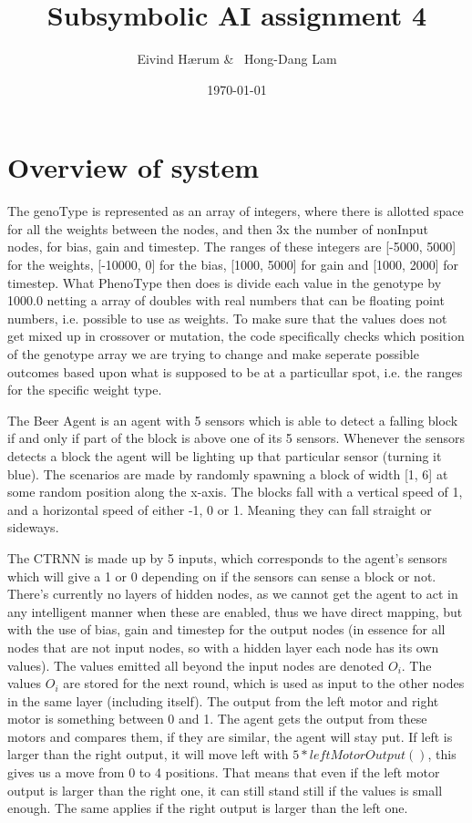 \documentclass[12pt, a4paper]{article}
\title{Subsymbolic AI assignment 4}
\author{Eivind Hærum \& \ Hong-Dang Lam}
\date{\today} %
\begin{document}
\maketitle
% 
% 
\newpage

\tableofcontents
{}
\newpage

\section{Overview of system}
The genoType is represented as an array of integers, where there is allotted space for all the weights between the nodes, and then 3x the number of nonInput nodes, for bias, gain and timestep. The ranges of these integers are [-5000, 5000] for the weights, [-10000, 0] for the bias, [1000, 5000] for gain and [1000, 2000] for timestep. What PhenoType then does is divide each value in the genotype by 1000.0 netting a array of doubles with real numbers that can be floating point numbers, i.e. possible to use as weights. To make sure that the values does not get mixed up in crossover or mutation, the code  specifically checks which position of the genotype array we are trying to change and make seperate possible outcomes based upon what is supposed to be at a particullar spot, i.e. the ranges for the specific weight type. 


The Beer Agent is an agent with 5 sensors which is able to detect a falling block if and only if part of the block is above one of its 5 sensors. Whenever the sensors detects a block the agent will be lighting up that particular sensor (turning it blue).
The scenarios are made by randomly spawning a block of width [1, 6] at some random position along the x-axis. The blocks fall with a vertical speed of 1, and a horizontal speed of either -1, 0 or 1. Meaning they can fall straight or sideways.

The CTRNN is made up by 5 inputs, which corresponds to the agent's sensors which will give a 1 or 0 depending on if the sensors can sense a block or not. There's currently no layers of hidden nodes, as we cannot get the agent to act in any intelligent manner when these are enabled, thus we have direct mapping, but with the use of bias, gain and timestep for the output nodes (in essence for all nodes that are not input nodes, so with a hidden layer each node has its own values). The values emitted all beyond the input nodes are denoted $ O_i $. The values $ O_i $ are stored for the next round, which is used as input to the other nodes in the same layer (including itself).
The output from the left motor and right motor is something between 0 and 1. The agent gets the output from these motors and compares them, if they are similar, the agent will stay put. If left is larger than the right output, it will move left with $ 5*leftMotorOutput() $, this gives us a move from 0 to 4 positions. That means that even if the left motor output is larger than the right one, it can still stand still if the values is small enough. The same applies if the right output is larger than the left one.
\end{document}
